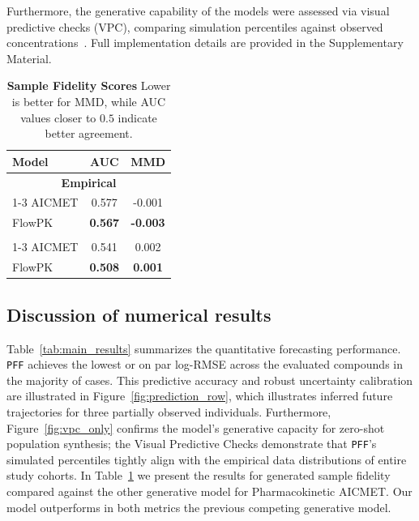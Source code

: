 Furthermore, the generative capability of the models were assessed via visual predictive checks (VPC), comparing simulation percentiles against observed concentrations~\citep{holford2005}. Full implementation details are provided in the Supplementary Material.


\begin{table}[t]
\centering
\caption{\textbf{Sample Fidelity Scores} Lower is better for MMD, while AUC values closer to $0.5$ indicate better agreement.}
\label{tab:sample_fidelity}
\scriptsize
\begin{tabular}{lcc}
\toprule
\textbf{Model} & \textbf{AUC} & \textbf{MMD} \\
\midrule
\multicolumn{3}{c}{\textbf{Empirical}} \\
\cmidrule(lr){1-3}
AICMET  & 	
0.577 & 	
-0.001 \\
FlowPK & 	
\textbf{0.567} & 	
\textbf{-0.003} \\
\addlinespace
\multicolumn{3}{c}{\textbf{Synthetic}} \\
\cmidrule(lr){1-3}
AICMET  & 0.541 & 	
0.002 \\
FlowPK & \textbf{0.508} & 	
\textbf{0.001} \\
\bottomrule
\end{tabular}
\end{table}

\subsection{Discussion of numerical results}

Table~\ref{tab:main_results} summarizes the quantitative forecasting performance. \texttt{PFF} achieves the lowest or on par log-RMSE across the evaluated compounds in the majority of cases. This predictive accuracy and robust uncertainty calibration are illustrated in Figure~\ref{fig:prediction_row}, which illustrates inferred future trajectories for three partially observed individuals. Furthermore, Figure~\ref{fig:vpc_only} confirms the model's generative capacity for zero-shot population synthesis; the Visual Predictive Checks demonstrate that \texttt{PFF}'s simulated percentiles tightly align with the empirical data distributions of entire study cohorts.
In Table~\ref{tab:sample_fidelity} we present the results for generated sample fidelity compared against the other generative model for Pharmacokinetic AICMET. Our model outperforms in both metrics the previous competing generative model.

